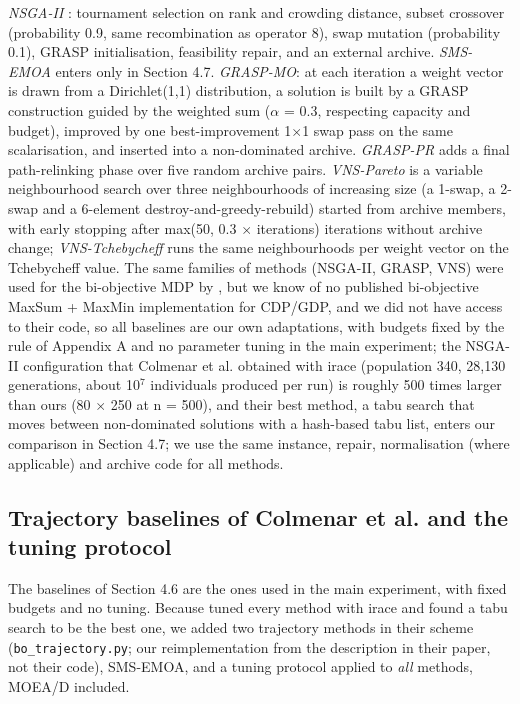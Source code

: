 \emph{NSGA-II} \citep{deb2002}: tournament selection on rank and crowding distance, subset crossover (probability 0.9, same recombination as operator 8), swap mutation (probability 0.1), GRASP initialisation, feasibility repair, and an external archive. \emph{SMS-EMOA} enters only in Section 4.7. \emph{GRASP-MO}: at each iteration a weight vector is drawn from a Dirichlet(1,1) distribution, a solution is built by a GRASP construction \citep{feo1995} guided by the weighted sum ($\alpha$ = 0.3, respecting capacity and budget), improved by one best-improvement 1$\times$1 swap pass on the same scalarisation, and inserted into a non-dominated archive. \emph{GRASP-PR} adds a final path-relinking phase over five random archive pairs. \emph{VNS-Pareto} is a variable neighbourhood search \citep{hansen2001} over three neighbourhoods of increasing size (a 1-swap, a 2-swap and a 6-element destroy-and-greedy-rebuild) started from archive members, with early stopping after max(50, 0.3 $\times$ iterations) iterations without archive change; \emph{VNS-Tchebycheff} runs the same neighbourhoods per weight vector on the Tchebycheff value. The same families of methods (NSGA-II, GRASP, VNS) were used for the bi-objective MDP by \citet{colmenar2018}, but we know of no published bi-objective MaxSum + MaxMin implementation for CDP/GDP, and we did not have access to their code, so all baselines are our own adaptations, with budgets fixed by the rule of Appendix A and no parameter tuning in the main experiment; the NSGA-II configuration that Colmenar et al. obtained with irace (population 340, 28,130 generations, about 10$^{7}$ individuals produced per run) is roughly 500 times larger than ours (80 $\times$ 250 at n = 500), and their best method, a tabu search that moves between non-dominated solutions with a hash-based tabu list, enters our comparison in Section 4.7; we use the same instance, repair, normalisation (where applicable) and archive code for all methods.

\subsection{Trajectory baselines of Colmenar et al. and the tuning protocol}\label{sec:trajectory_baselines_of_colm}

The baselines of Section 4.6 are the ones used in the main experiment, with fixed budgets and no tuning. Because \citet{colmenar2018} tuned every method with irace \citep{lopezibanez2016} and found a tabu search to be the best one, we added two trajectory methods in their scheme (\texttt{bo\_\allowbreak{}trajectory.py}; our reimplementation from the description in their paper, not their code), SMS-EMOA, and a tuning protocol applied to \emph{all} methods, MOEA/D included.

